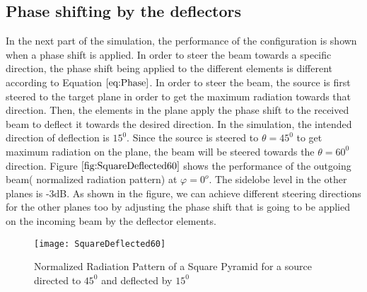 \documentclass[titlepage]{article}
\begin{document}
\subsection{Phase shifting by the deflectors}
In the next part of the simulation, the performance of the configuration is shown when a phase shift is applied. In order to steer the beam towards a specific direction, the phase shift being applied to the different elements is different according to Equation $\ref{eq:Phase}$. In order to steer the beam, the source is first steered to the target plane in order to get the maximum radiation towards that direction. Then, the elements in the plane apply the phase shift to the received beam to deflect it towards the desired direction. In the simulation, the intended direction of deflection is $15^0$. Since the source is steered to $\theta = 45^0$ to get maximum radiation on the plane, the beam will be steered towards the $\theta = 60^0$ direction. Figure $\ref{fig:SquareDeflected60}$ shows the performance of the outgoing beam( normalized radiation pattern) at $\varphi = 0^o$. The sidelobe level in the other planes is -3dB. As shown in the figure, we can achieve different steering directions for the other planes too by adjusting the phase shift that is going to be applied on the incoming beam by the deflector elements.
\begin{figure}[!hbp]
\centering
\texttt{[image: SquareDeflected60]}
\caption{Normalized Radiation Pattern of a Square Pyramid for a source directed to $45^0$ and deflected by $15^0$}
\label{fig:SquareDeflected60}
\end{figure}
\newpage
\end{document}
